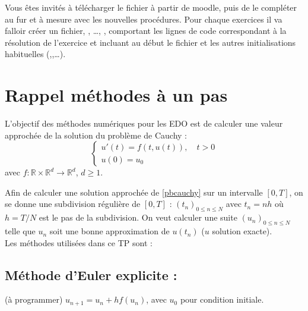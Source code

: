 \documentclass[a4paper,12pt,reqno]{amsart}
\begin{document}

Vous êtes invités à télécharger le fichier  à partir de moodle, puis de le compléter au fur et à mesure avec les nouvelles procédures. Pour chaque exercices il va falloir créer un fichier, , \dots, , comportant les lignes de code correspondant à la résolution de l'exercice et incluant au début le fichier  et les autres initialisations habituelles (,,\ldots).

\section{Rappel méthodes à un pas}

L'objectif des méthodes numériques pour les EDO est de calculer une valeur approchée de la solution du problème de Cauchy :
\begin{equation}\label{pbcauchy}\tag{$\star$}
    \begin{cases}
      u'(t)=f(t,u(t)),\quad t>0 \\
      u(0)=u_0
    \end{cases}
\end{equation}
avec $f: \mathbb{R} \times \mathbb{R}^d \to  \mathbb{R}^d$, $d \geq 1$.


Afin de calculer une solution approchée de \eqref{pbcauchy} sur un intervalle $[0,T]$, on se donne une subdivision régulière de $[0,T]$ :
$(t_n)_{0\leq n\leq N}$ avec $t_n=nh$ où $h=T/N$ est le pas de la subdivision.
On veut calculer une suite $(u_n)_{0\leq n\leq N}$ telle
que $u_n$ soit une \og{}bonne\fg{} approximation de $u(t_n)$ ($u$ solution
exacte). \\
Les méthodes utilisées dans ce TP sont :

\subsection*{Méthode d'Euler explicite :} (à programmer)\newline
$ u_{n+1}=u_n+h f(u_n)$, avec $u_0$ pour condition initiale.
\end{document}
